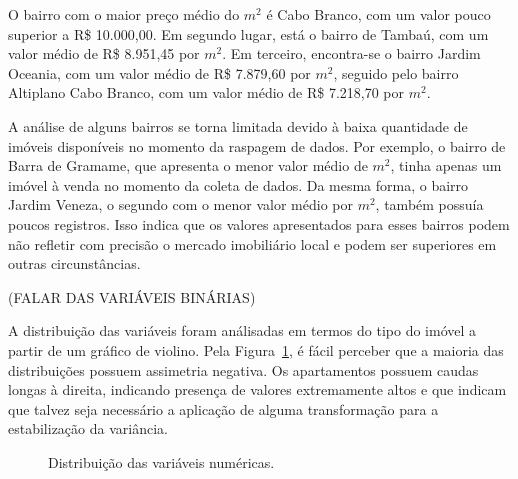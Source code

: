 \documentclass[
  12pt,
  a4paper,
]{scrreprt}
\begin{document}
\vspace{12pt}

O bairro com o maior preço médio do \(m^2\) é Cabo Branco, com um valor
pouco superior a R\$ 10.000,00. Em segundo lugar, está o bairro de
Tambaú, com um valor médio de R\$ 8.951,45 por \(m^2\). Em terceiro,
encontra-se o bairro Jardim Oceania, com um valor médio de R\$ 7.879,60
por \(m^2\), seguido pelo bairro Altiplano Cabo Branco, com um valor
médio de R\$ 7.218,70 por \(m^2\).

\vspace{12pt}

A análise de alguns bairros se torna limitada devido à baixa quantidade
de imóveis disponíveis no momento da raspagem de dados. Por exemplo, o
bairro de Barra de Gramame, que apresenta o menor valor médio de
\(m^2\), tinha apenas um imóvel à venda no momento da coleta de dados.
Da mesma forma, o bairro Jardim Veneza, o segundo com o menor valor
médio por \(m^2\), também possuía poucos registros. Isso indica que os
valores apresentados para esses bairros podem não refletir com precisão
o mercado imobiliário local e podem ser superiores em outras
circunstâncias.

\vspace{12pt}

(FALAR DAS VARIÁVEIS BINÁRIAS)

\vspace{12pt}

A distribuição das variáveis foram análisadas em termos do tipo do
imóvel a partir de um gráfico de violino. Pela Figura~\ref{fig-violin},
é fácil perceber que a maioria das distribuições possuem assimetria
negativa. Os apartamentos possuem caudas longas à direita, indicando
presença de valores extremamente altos e que indicam que talvez seja
necessário a aplicação de alguma transformação para a estabilização da
variância.

\begin{figure}


\caption{\label{fig-violin}Distribuição das variáveis numéricas.}

\end{figure}%
\end{document}
